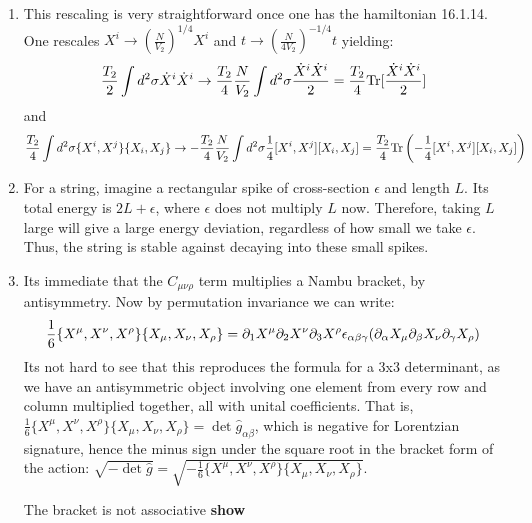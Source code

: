 \documentclass[11pt, class=article, crop=false]{standalone}
\begin{document}
\begin{enumerate}
	The transverse momenta are:
	\[
		p^i = \frac{\delta L}{\delta(\d_\tau X^i)}= T_2 \dot X^i = \frac{p^+}{V} \dot X^i
	\]
	The Hamiltonian is thus
	\[
		p_- \dot X^- - \mathcal L + \int d^2 \xi \, p_i \dot X^i
	\]
	
	\item This rescaling is very straightforward once one has the hamiltonian 16.1.14. One rescales $X^i \to \left(\frac{N}{V_2}\right)^{1/4} X^i$ and $t \to \left(\frac{N}{4 V_2}\right)^{-1/4} t$ yielding:
	\[
		\frac{T_2}{2} \int d^2 \sigma \dot X^i \dot X^i \to \frac{T_2}{4} \frac{N}{V_2} \int d^2 \sigma \frac{\dot X^i \dot X^i}{2} = \frac{T_2}{4} \mathrm{Tr}[\frac{\dot X^i \dot X^i}{2} ]
	\]
	and 
	\[
		\frac{T_2}{4} \int d^2 \sigma  \{X^i, X^j\} \{X_{i}, X_{j}\} \to -\frac{T_2}{4} \frac{N}{V_2} \int d^2 \sigma \frac14 [X^i, X^j] [X_{i}, X_{j}] = \frac{T_2}{4} \mathrm{Tr}\left(-\frac14 [X^i, X^j] [X_{i}, X_{j}] \right)
	\]
	
	\item For a string, imagine a rectangular spike of cross-section $\epsilon$ and length $L$. Its total energy is $2 L + \epsilon$, where $\epsilon$ does not multiply $L$ now. Therefore, taking $L$ large will give a large energy deviation, regardless of how small we take $\epsilon$. Thus, the string is stable against decaying into these small spikes. 
	
	\item Its immediate that the $C_{\mu \nu \rho}$ term multiplies a Nambu bracket, by antisymmetry. Now by permutation invariance we can write:
	\[
		\frac16 \{X^\mu, X^\nu, X^\rho\}  \{X_\mu, X_\nu, X_\rho\} = \partial_1 X^\mu \partial_2 X^\nu \partial_3 X^\rho \epsilon_{\alpha \beta \gamma} (\partial_\alpha X_\mu \partial_\beta X_\nu \partial_\gamma X_\rho)
	\]
	Its not hard to see that this reproduces the formula for a 3x3 determinant, as we have an antisymmetric object involving one element from every row and column multiplied together, all with unital coefficients. That is, $\frac16 \{X^\mu, X^\nu, X^\rho\}\{X_\mu, X_\nu, X_\rho\} = \det \hat g_{\alpha\beta}$, which is negative for Lorentzian signature, hence the minus sign under the square root in the bracket form of the action: $\sqrt{-\det \hat g} = \sqrt{-\frac16 \{X^\mu, X^\nu, X^\rho\}\{X_\mu, X_\nu, X_\rho\}}$.
	
	The bracket is not associative \textbf{show}

\end{enumerate}

\end{document}
